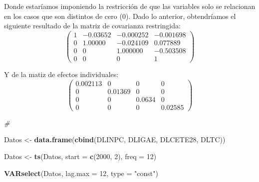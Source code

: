 \documentclass[
]{book}
\newenvironment{Shaded}{\begin{snugshade}}{\end{snugshade}}
\newcommand{\AttributeTok}[1]{\textcolor[rgb]{0.13,0.29,0.53}{#1}}
\newcommand{\CommentTok}[1]{\textcolor[rgb]{0.56,0.35,0.01}{\textit{#1}}}
\newcommand{\DecValTok}[1]{\textcolor[rgb]{0.00,0.00,0.81}{#1}}
\newcommand{\FunctionTok}[1]{\textcolor[rgb]{0.13,0.29,0.53}{\textbf{#1}}}
\newcommand{\NormalTok}[1]{#1}
\newcommand{\OtherTok}[1]{\textcolor[rgb]{0.56,0.35,0.01}{#1}}
\newcommand{\StringTok}[1]{\textcolor[rgb]{0.31,0.60,0.02}{#1}}
\begin{document}
Donde estaríamos imponiendo la restricción de que las variables solo se relacionan en los casos que son distintos de cero (0). Dado lo anterior, obtendríamos el siguiente resultado de la matriz de covarianza restringida:
\begin{equation*}
    \begin{pmatrix}
    1 & -0.03652 & -0.000252 & -0.001698 \\
    0         & 1.00000 & -0.024109 & 0.077889 \\
    0         & 0         & 1.000000 & -0.503508 \\
    0         & 0         & 0         & 1
    \end{pmatrix}
\end{equation*}

Y de la matiz de efectos individuales:
\begin{equation*}
    \begin{pmatrix}
    0.002113 & 0 & 0 & 0 \\
    0         & 0.01369 & 0 & 0 \\
    0         & 0         & 0.0634 & 0 \\
    0         & 0         & 0         & 0.02585
    \end{pmatrix}
\end{equation*}

\begin{Shaded}
\begin{Highlighting}[]
\CommentTok{\#}

\NormalTok{Datos }\OtherTok{\textless{}{-}} \FunctionTok{data.frame}\NormalTok{(}\FunctionTok{cbind}\NormalTok{(DLINPC, DLIGAE, DLCETE28, DLTC))}

\NormalTok{Datos }\OtherTok{\textless{}{-}} \FunctionTok{ts}\NormalTok{(Datos, }
            \AttributeTok{start =} \FunctionTok{c}\NormalTok{(}\DecValTok{2000}\NormalTok{, }\DecValTok{2}\NormalTok{), }\AttributeTok{freq =} \DecValTok{12}\NormalTok{)}

\FunctionTok{VARselect}\NormalTok{(Datos, }\AttributeTok{lag.max =} \DecValTok{12}\NormalTok{, }\AttributeTok{type =} \StringTok{"const"}\NormalTok{)}
\end{Highlighting}
\end{Shaded}
\end{document}
